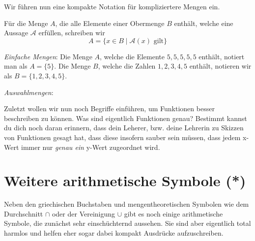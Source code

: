 Wir führen nun eine kompakte Notation für kompliziertere Mengen ein. 
\begin{definition}[Auswahl]
    Für die Menge \(A\), die alle Elemente einer Obermenge \(B\) enthält, welche eine Aussage \(\mathscr A\) erfüllen, schreiben wir 
    \begin{equation*}
        A = \{x \in B \mid \mathscr A(x) \text{ gilt}\}
    \end{equation*}
\end{definition}


\begin{definition}[Komplement]
    
\end{definition}

\begin{example}
    \begin{thmenum}
        \item \textit{Einfache Mengen}: Die Menge \(A\), welche die Elemente \(5, 5, 5, 5, 5\) enthält, notiert man als \(A = \{5\}\). Die Menge \(B\), welche die Zahlen \(1, 2, 3, 4, 5\) enthält, notieren wir als \(B = \{1, 2, 3, 4, 5\}\). 

        \item \textit{Auswahlmengen}:
    \end{thmenum}
\end{example}

\begin{definition}
    
\end{definition}

Zuletzt wollen wir nun noch Begriffe einführen, um Funktionen besser beschreiben zu können. Was sind eigentlich Funktionen genau? Bestimmt kannst du dich noch daran erinnern, dass dein Leherer, bzw. deine Lehrerin zu Skizzen von Funktionen gesagt hat, dass diese insofern sauber sein müssen, dass jedem x-Wert immer nur \textit{genau ein} y-Wert zugeordnet wird. 


\section{Weitere arithmetische Symbole (*)}
Neben den griechischen Buchstaben und mengentheoretischen Symbolen wie dem Durchschnitt \(\cap\) oder der Vereinigung \(\cup\) gibt es noch einige arithmetische Symbole, die zunächst sehr einschüchternd aussehen. Sie sind aber eigentlich total harmlos und helfen eher sogar dabei kompakt Ausdrücke aufzuschreiben. 

